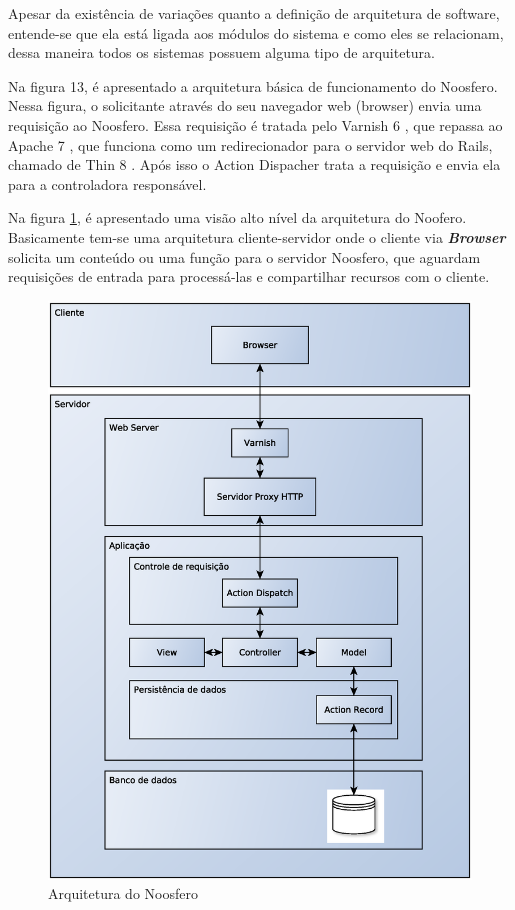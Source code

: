 Apesar da existência de variações quanto a definição de arquitetura de software, entende-se que ela está ligada aos módulos do sistema e como eles se relacionam, dessa maneira todos os sistemas possuem alguma tipo de arquitetura.

Na figura 13, é apresentado a arquitetura básica de funcionamento do Noosfero.
Nessa figura, o solicitante através do seu navegador web (browser) envia uma requisição ao
Noosfero. Essa requisição é tratada pelo Varnish 6 , que repassa ao Apache 7 , que funciona
como um redirecionador para o servidor web do Rails, chamado de Thin 8 . Após isso o
Action Dispacher trata a requisição e envia ela para a controladora responsável.

Na figura \ref{arquitetura-noosfero}, é apresentado uma visão alto nível da arquitetura do Noofero. Basicamente tem-se uma arquitetura cliente-servidor onde o cliente via \textbf{\textit{Browser}} solicita um conteúdo ou uma função para o servidor Noosfero, que aguardam requisições de entrada para processá-las e compartilhar recursos com o cliente.

\begin{figure}[h]
    \centering
    \includegraphics[keepaspectratio=true,scale=0.4]
      {figuras/DiagramaDeArquitetura.eps}
    \caption{Arquitetura do Noosfero}
    \label{arquitetura-noosfero}
\end{figure}

